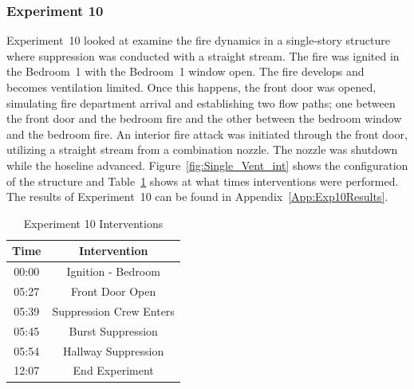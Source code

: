 \documentclass[12pt,oneside]{book}
\begin{document}
\FloatBarrier

\subsubsection{Experiment 10}
Experiment~10 looked at examine the fire dynamics in a single-story structure where suppression was conducted with a straight stream. The fire was ignited in the Bedroom~1 with the Bedroom~1 window open. The fire develops and becomes ventilation limited. Once this happens, the front door was opened, simulating fire department arrival and establishing two flow paths; one between the front door and the bedroom fire and the other between the bedroom window and the bedroom fire. An interior fire attack was initiated through the front door, utilizing a straight stream from a combination nozzle. The nozzle was shutdown while the hoseline advanced. Figure~\ref{fig:Single_Vent_int} shows the configuration of the structure and Table~\ref{Table:Exp10Interventions} shows at what times interventions were performed. The results of Experiment~10 can be found in Appendix~\ref{App:Exp10Results}. 


\begin{table}[H]
	\centering
	\caption{Experiment 10 Interventions}
	\begin{tabular}{|c|c|} 
		\hline
		Time & Intervention \\ \hline \hline
		00:00 & Ignition - Bedroom \\ \hline
		05:27 & Front Door Open \\ \hline
		05:39 & Suppression Crew Enters\\ \hline
		05:45 & Burst Suppression \\ \hline 
		05:54 & Hallway Suppression \\ \hline
		12:07 & End Experiment\\ \hline
	\end{tabular}
	\label{Table:Exp10Interventions}
\end{table}

\FloatBarrier
\end{document}
